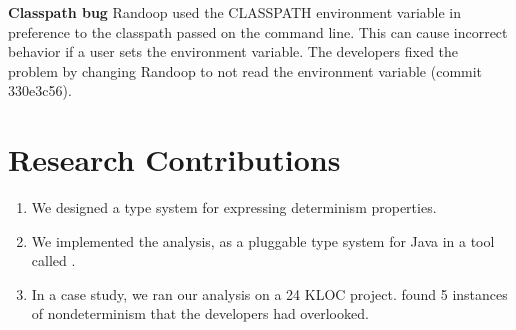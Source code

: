     \textbf{Classpath bug}
    Randoop used the CLASSPATH environment variable in preference to the
    classpath passed on the command line.
    This can cause incorrect behavior
    if a user sets the environment variable.
    The developers fixed the problem by changing Randoop to not read the environment variable
    (commit 330e3c56).




\section{Research Contributions\label{sec:contributions}}
\begin{enumerate}
  \item We designed a type system for expressing determinism properties.

  \item We implemented the analysis, as a pluggable type system for Java in a
    tool called \theDeterminismChecker.

  \item In a case study, we ran our analysis on a 24 KLOC project.
    \TheDeterminismChecker
    found 5 instances of nondeterminism that the developers had
    overlooked.
\end{enumerate}


